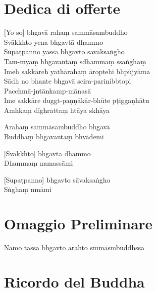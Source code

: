 
\chapter{Dedica di offerte}   %

[Yo so] bhgavā rahaṃ sammāsambuddho\\
Svākkhto yena bhgavtā dhammo\\
Supaṭpanno yassa bhgavto sāvaksaṅgho\\
Tam-myaṃ bhgavantaṃ sdhammaṃ ssaṅghaṃ\\
Imeh sakkāreh yathārahaṃ āroptehi bhpūjyāma\\
Sādh no bhante bhgavā scira-parinibbtopi\\
Pacchmā-jntānkamp-mānasā\\
Ime sakkāre duggt-paṇṇākār-bhūte pṭiggaṇhātu\\
Amhkaṃ dīghrattaṃ htāya skhāya

Arahaṃ sammāsambuddho bhgavā\\
Buddhaṃ bhgavantaṃ bhvādemi 

[Svākkhto] bhgavtā dhammo\\
Dhammaṃ namassāmi 

[Supaṭpanno] bhgavto sāvaksaṅgho\\
Sṅghaṃ nmāmi 

\chapter{Omaggio Preliminare}

\begin{leader}
\end{leader}

Namo tassa bhgavto arahto smmāsmbuddhssa


\clearpage

\chapter{Ricordo del Buddha}     %

